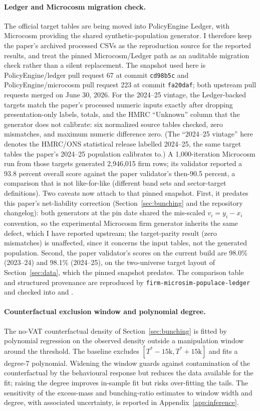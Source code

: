 \paragraph{Ledger and Microcosm migration check.} The official target tables are
being moved into PolicyEngine Ledger, with Microcosm providing the shared
synthetic-population generator. I therefore keep the paper's archived processed
CSVs as the reproduction source for the reported results, and treat the pinned
Microcosm/Ledger path as an auditable migration check rather than a silent
replacement. The snapshot used here is PolicyEngine/ledger pull request 67
at commit \texttt{cd98b5c} and PolicyEngine/microcosm pull request 223 at commit
\texttt{fa20daf}; both upstream pull requests merged on June 30, 2026. For the
2024--25 vintage, the Ledger-backed targets match the paper's
processed numeric inputs exactly after dropping presentation-only labels,
totals, and the HMRC ``Unknown'' column that the generator does not calibrate:
six normalized source tables checked, zero mismatches, and maximum numeric
difference zero. (The ``2024--25 vintage'' here denotes the HMRC/ONS
statistical release labelled 2024--25, the same target tables the paper's
2024--25 population calibrates to.) A 1,000-iteration Microcosm run from those
targets generated 2,946,015 firm rows; its validator reported a 93.8 percent
overall score against the paper validator's then-90.5 percent, a comparison
that is not like-for-like (different band sets and sector-target definitions).
Two caveats now attach to that pinned snapshot. First, it predates this
paper's net-liability correction (Section~\ref{sec:bunching} and the repository changelog): both
generators at the pin date shared the mis-scaled $v_i = y_i - x_i$ convention,
so the experimental Microcosm firm generator inherits the same defect, which I
have reported upstream; the target-parity result (zero mismatches) is
unaffected, since it concerns the input tables, not the generated population.
Second, the paper validator's scores on the current build are
98.0\% (2023--24) and 98.1\% (2024--25), on the
two-universe target layout of Section~\ref{sec:data}, which the pinned
snapshot predates. The comparison table and structured provenance are
reproduced by \texttt{firm-microsim-populace-ledger} and checked into
 and
.

\paragraph{Counterfactual exclusion window and polynomial degree.} The no-VAT
counterfactual density of Section~\ref{sec:bunching} is fitted by polynomial
regression on the observed density outside a manipulation window around the
threshold. The baseline excludes $[T^{*}-15\text{k}, T^{*}+15\text{k}]$ and fits
a degree-7 polynomial. Widening the window guards against contamination of the counterfactual
by the behavioural response but reduces the data available for the fit; raising
the degree improves in-sample fit but risks over-fitting the tails. The
sensitivity of the excess-mass and bunching-ratio estimates to window width and
degree, with associated uncertainty, is reported in
Appendix~\ref{app:inference}.
